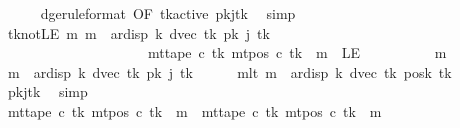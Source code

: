 \begin{isabellebody}
\ \ \ \ \isamarkupfalse%
\ dge{}{\isacharbrackleft}{\kern0pt}rule{\isacharunderscore}{\kern0pt}format{\isacharcomma}{\kern0pt}\ OF\ tk{\isacharunderscore}{\kern0pt}active{\isacharbrackright}{\kern0pt}\ pkj{\isacharunderscore}{\kern0pt}tk\ \isamarkupfalse%
\ simp\isanewline
\ \ \isamarkupfalse%
\ tk{\isacharunderscore}{\kern0pt}notLE{\isacharcolon}{\kern0pt}\ {\isachardoublequoteopen}{\isasymAnd}m{\isachardot}{\kern0pt}\ m\ {\isacharless}{\kern0pt}\ ar{\isacharunderscore}{\kern0pt}disp\ {\isacharquery}{\kern0pt}k\ {\isacharparenleft}{\kern0pt}dvec\ {\isacharquery}{\kern0pt}tk{\isacharparenright}{\kern0pt}\ {\isacharparenleft}{\kern0pt}{\isacharquery}{\kern0pt}pk\ j\ {\isacharquery}{\kern0pt}tk{\isacharparenright}{\kern0pt}\isanewline
\ \ \ \ \ \ \ \ \ \ \ \ \ \ \ \ \ \ \ \ {\isasymLongrightarrow}\ mt{\isacharunderscore}{\kern0pt}tape\ c\ {\isacharquery}{\kern0pt}tk\ {\isacharparenleft}{\kern0pt}mt{\isacharunderscore}{\kern0pt}pos\ c\ {\isacharquery}{\kern0pt}tk\ {\isacharminus}{\kern0pt}\ m{\isacharparenright}{\kern0pt}\ {\isasymnoteq}\ LE{}{\isachardoublequoteclose}\isanewline
\ \ \isamarkupfalse%
\ {\isacharminus}{\kern0pt}\isanewline
\ \ \ \ \isamarkupfalse%
\ m\ \isamarkupfalse%
\ {\isachardoublequoteopen}m\ {\isacharless}{\kern0pt}\ ar{\isacharunderscore}{\kern0pt}disp\ {\isacharquery}{\kern0pt}k\ {\isacharparenleft}{\kern0pt}dvec\ {\isacharquery}{\kern0pt}tk{\isacharparenright}{\kern0pt}\ {\isacharparenleft}{\kern0pt}{\isacharquery}{\kern0pt}pk\ j\ {\isacharquery}{\kern0pt}tk{\isacharparenright}{\kern0pt}{\isachardoublequoteclose}\isanewline
\ \ \ \ \isamarkupfalse%
\ mlt{\isacharcolon}{\kern0pt}\ {\isachardoublequoteopen}m\ {\isacharless}{\kern0pt}\ ar{\isacharunderscore}{\kern0pt}disp\ {\isacharquery}{\kern0pt}k\ {\isacharparenleft}{\kern0pt}dvec\ {\isacharquery}{\kern0pt}tk{\isacharparenright}{\kern0pt}\ {\isacharparenleft}{\kern0pt}posk{}\ {\isacharquery}{\kern0pt}tk{\isacharparenright}{\kern0pt}{\isachardoublequoteclose}\ \isamarkupfalse%
\ pkj{\isacharunderscore}{\kern0pt}tk\ \isamarkupfalse%
\ simp\isanewline
\ \ \ \ \isamarkupfalse%
\ {\isachardoublequoteopen}mt{\isacharunderscore}{\kern0pt}tape\ c\ {\isacharquery}{\kern0pt}tk\ {\isacharparenleft}{\kern0pt}mt{\isacharunderscore}{\kern0pt}pos\ c\ {\isacharquery}{\kern0pt}tk\ {\isacharminus}{\kern0pt}\ m{\isacharparenright}{\kern0pt}\ {\isacharequal}{\kern0pt}\ mt{\isacharunderscore}{\kern0pt}tape\ c{}\ {\isacharquery}{\kern0pt}tk\ {\isacharparenleft}{\kern0pt}mt{\isacharunderscore}{\kern0pt}pos\ c{}\ {\isacharquery}{\kern0pt}tk\ {\isacharminus}{\kern0pt}\ m{\isacharparenright}{\kern0pt}{\isachardoublequoteclose}\isanewline

\end{isabellebody}

